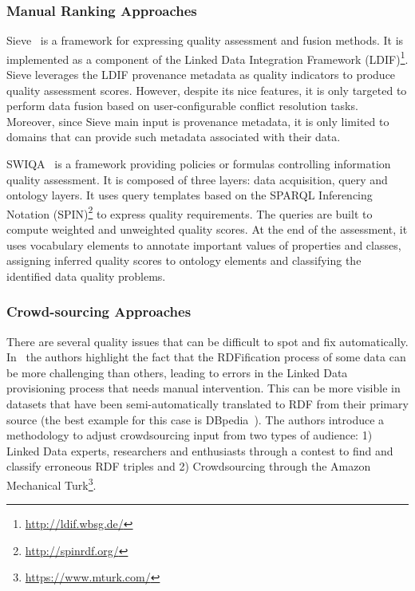 \documentclass[onecolumn, crcready]{../../Util/LaTEX/iosart2c}
\begin{document}
\subsubsection{Manual Ranking Approaches}
Sieve~\cite{Mendes:EDBT:12} is a framework for expressing quality assessment and fusion methods. It is implemented as a component of the Linked Data Integration Framework (LDIF)\footnote{\url{http://ldif.wbsg.de/}}. Sieve leverages the LDIF provenance metadata as quality indicators to produce quality assessment scores. However, despite its nice features, it is only targeted to perform data fusion based on user-configurable conflict resolution tasks. Moreover, since Sieve main input is provenance metadata, it is only limited to domains that can provide such metadata associated with their data.

SWIQA~\cite{Furber:ECIS:11} is a framework providing policies or formulas controlling information quality assessment. It is composed of three layers: data acquisition, query and ontology layers. It uses query templates based on the SPARQL Inferencing Notation (SPIN)\footnote{\url{http://spinrdf.org/}} to express quality requirements. The queries are built to compute weighted and unweighted quality scores. At the end of the assessment, it uses vocabulary elements to annotate important values of properties and classes, assigning inferred quality scores to ontology elements and classifying the identified data quality problems.

\subsubsection{Crowd-sourcing Approaches}
There are several quality issues that can be difficult to spot and fix automatically. In~\cite{Acosta:ISWC:13} the authors highlight the fact that the RDFification process of some data can be more challenging than others, leading to errors in the Linked Data provisioning process that needs manual intervention. This can be more visible in datasets that have been semi-automatically translated to RDF from their primary source (the best example for this case is DBpedia~\cite{Bizer:WebSemJorunal:09}). The authors introduce a methodology to adjust crowdsourcing input from two types of audience: 1) Linked Data experts, researchers and enthusiasts through a contest to find and classify erroneous RDF triples and 2) Crowdsourcing through the Amazon Mechanical Turk\footnote{\url{https://www.mturk.com/}}.
\end{document}
